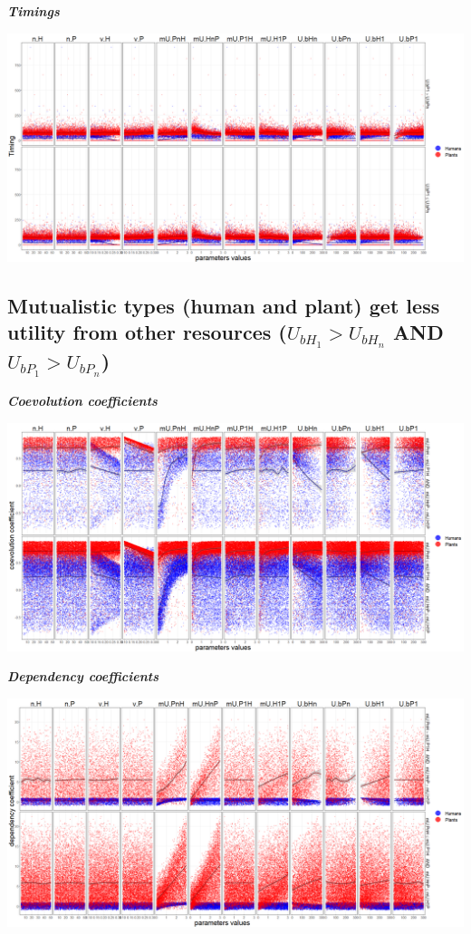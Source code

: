 \documentclass[]{book}
\begin{document}
\textbf{\emph{Timings}}

\includegraphics[width=1\linewidth]{plots/5_multiplePar-timing-plantLessBase-ggplot}

\newpage

\hypertarget{mutualistic-types-human-and-plant-get-less-utility-from-other-resources-u_bh_1u_bh_n-and-u_bp_1u_bp_n}{%
\subsection{\texorpdfstring{Mutualistic types (human and plant) get less utility from other resources (\(U_{bH_{1}}>U_{bH_{n}}\) AND \(U_{bP_{1}}>U_{bP_{n}}\))}{Mutualistic types (human and plant) get less utility from other resources (U\_\{bH\_\{1\}\}\textgreater{}U\_\{bH\_\{n\}\} AND U\_\{bP\_\{1\}\}\textgreater{}U\_\{bP\_\{n\}\})}}\label{mutualistic-types-human-and-plant-get-less-utility-from-other-resources-u_bh_1u_bh_n-and-u_bp_1u_bp_n}}

\textbf{\emph{Coevolution coefficients}}

\includegraphics[width=1\linewidth]{plots/5_multiplePar-coevo-bothLessBase-ggplot}

\textbf{\emph{Dependency coefficients}}

\includegraphics[width=1\linewidth]{plots/5_multiplePar-depend-bothLessBase-ggplot}
\end{document}
